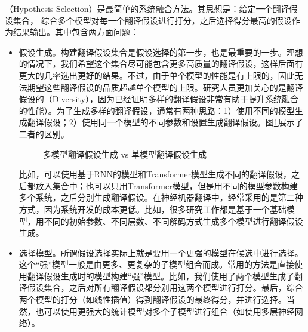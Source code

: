 （Hypothesis Selection）是最简单的系统融合方法\cite{DBLP:conf/emnlp/DuanLXZ09}。其思想是：给定一个翻译假设集合， 综合多个模型对每一个翻译假设进行打分，之后选择得分最高的假设作为结果输出。其中包含两方面问题：

\begin{itemize}
\vspace{0.5em}
\item 假设生成。构建翻译假设集合是假设选择的第一步，也是最重要的一步。理想的情况下，我们希望这个集合尽可能包含更多高质量的翻译假设，这样后面有更大的几率选出更好的结果。不过，由于单个模型的性能是有上限的，因此无法期望这些翻译假设的品质超越单个模型的上限。研究人员更加关心的是翻译假设的{\small{}}（Diversity），因为已经证明多样的翻译假设非常有助于提升系统融合的性能\cite{DBLP:journals/corr/LiMJ16,xiao2013bagging}）。为了生成多样的翻译假设，通常有两种思路：1）使用不同的模型生成翻译假设；2）使用同一个模型的不同参数和设置生成翻译假设。图\ref{fig:7-24}展示了二者的区别。

\begin{figure}[htp]
\centering

\caption{多模型翻译假设生成 vs 单模型翻译假设生成}
\label{fig:7-24}
\end{figure}

比如，可以使用基于RNN的模型和Transformer模型生成不同的翻译假设，之后都放入集合中；也可以只用Transformer模型，但是用不同的模型参数构建多个系统，之后分别生成翻译假设。在神经机器翻译中，经常采用的是第二种方式，因为系统开发的成本更低。比如，很多研究工作都是基于一个基础模型，用不同的初始参数、不同层数、不同解码方式生成多个模型进行翻译假设生成。

\vspace{0.5em}
\item 选择模型。所谓假设选择实际上就是要用一个更强的模型在候选中进行选择。这个``强''模型一般是由更多、更复杂的子模型组合而成。常用的方法是直接使用翻译假设生成时的模型构建``强''模型。比如，我们使用了两个模型生成了翻译假设集合，之后对所有翻译假设都分别用这两个模型进行打分。最后，综合两个模型的打分（如线性插值）得到翻译假设的最终得分，并进行选择。当然，也可以使用更强大的统计模型对多个子模型进行组合（如使用多层神经网络）。
\vspace{0.5em}

\end{itemize}

